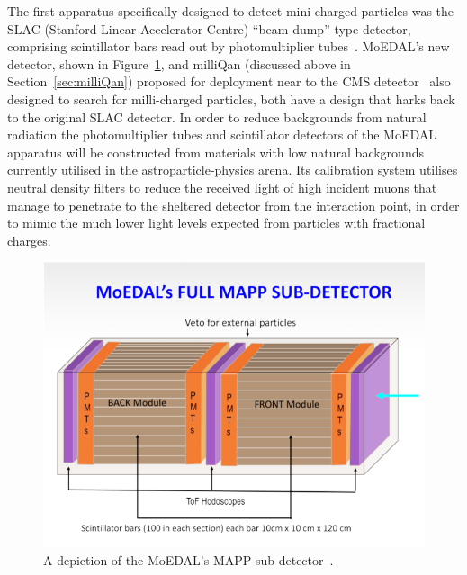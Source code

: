 The first apparatus specifically designed to detect mini-charged particles was the SLAC (Stanford Linear Accelerator Centre) ``beam dump''-type detector, comprising scintillator bars read out by photomultiplier tubes~\cite{Prinz:1998ua}. MoEDAL's new detector, shown in Figure~\ref{fg:mapp}, and milliQan (discussed above in Section~\ref{sec:milliQan}) proposed for deployment near to the CMS detector~\cite{Haas:2014dda} also designed to search for milli-charged particles, both have a design that harks back to the original SLAC detector. In order to reduce backgrounds from natural radiation the photomultiplier tubes and scintillator detectors of the MoEDAL apparatus will be constructed from materials with low natural backgrounds currently utilised in the astroparticle-physics arena. Its calibration system utilises neutral density filters to reduce the received light of high incident muons that manage to penetrate to the sheltered detector from the interaction point, in order to mimic the much lower light levels expected from particles with fractional charges.

\begin{figure}[ht]
   \centering
   \includegraphics[width=0.95\linewidth]{plots/MAPP-NEW.pdf}
   \caption{A depiction of the MoEDAL's MAPP sub-detector~\cite{mapp-mall-pinfold}.}
   \label{fg:mapp}
\end{figure}


